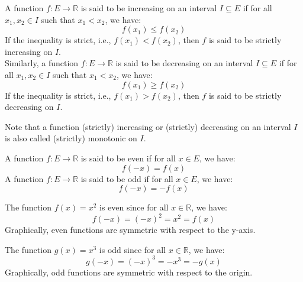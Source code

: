 \begin{definition}
    A function $f : E \to \mathbb{R}$ is said to be increasing on an interval $I \subseteq E$ if for all $x_1, x_2 \in I$ such that $x_1 < x_2$, we have:
    \[
        f(x_1) \leq f(x_2)
    \]
    If the inequality is strict, i.e., $f(x_1) < f(x_2)$, then $f$ is said to be strictly increasing on $I$. \\
    Similarly, a function $f : E \to \mathbb{R}$ is said to be decreasing on an interval $I \subseteq E$ if for all $x_1, x_2 \in I$ such that $x_1 < x_2$, we have:
    \[
        f(x_1) \geq f(x_2)
    \]
    If the inequality is strict, i.e., $f(x_1) > f(x_2)$, then $f$ is said to be strictly decreasing on $I$.
\end{definition}
Note that a function (strictly) increasing or (strictly) decreasing on an interval $I$ is also called (strictly) monotonic on $I$.

\begin{definition}
    A function $f : E \to \mathbb{R}$ is said to be even if for all $x \in E$, we have:
    \[
        f(-x) = f(x)
    \]
    A function $f : E \to \mathbb{R}$ is said to be odd if for all $x \in E$, we have:
    \[
        f(-x) = -f(x)
    \]
\end{definition}
\begin{eg}
    The function $f(x) = x^2$ is even since for all $x \in \mathbb{R}$, we have:
    \[
        f(-x) = (-x)^2 = x^2 = f(x)
    \]
    Graphically, even functions are symmetric with respect to the y-axis.
    \begin{center}
    \end{center}
    The function $g(x) = x^3$ is odd since for all $x \in \mathbb{R}$, we have:
    \[
        g(-x) = (-x)^3 = -x^3 = -g(x)
    \]
    Graphically, odd functions are symmetric with respect to the origin.
    \begin{center}
    \end{center}
\end{eg}

